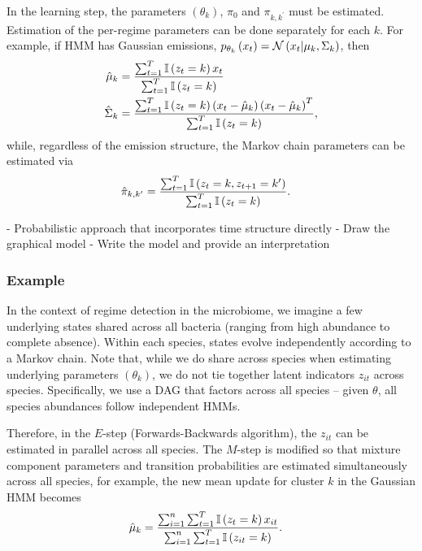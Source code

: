 \documentclass{article}
\begin{document}
In the learning step, the parameters $\left(\theta_{k}\right)$, $\pi_0$ and
$\pi_{k, k^{\prime}}$ must be estimated. Estimation of the per-regime parameters
can be done separately for each $k$. For example, if HMM has Gaussian emissions,
$p_{\theta_{k}}\left(x_{t}\right) = \mathcal{N}\left(x_{t} \vert \mu_{k},
\Sigma_{k}\right)$, then
\begin{align*}
  \hat{\mu}_{k} &= \frac{\sum_{t = 1}^{T} \mathbb{I}\left({z_{t} = k}\right)x_{t}}{\sum_{t = 1}^{T}\mathbb{I}\left({z_{t} = k}\right)} \\
  \hat{\Sigma}_{k} &= \frac{\sum_{t = 1}^{T} \mathbb{I}\left({z_{t} = k}\right)\left(x_{t} - \hat{\mu}_{k}\right)\left(x_{t} - \hat{\mu}_{k}\right)^{T}}
      {\sum_{t = 1}^{T} \mathbb{I}\left({z_{t} = k}\right)},
\end{align*}
while, regardless of the emission structure, the Markov chain parameters can be
estimated via
\begin{align*}
  \hat{\pi}_{k, k^{\prime}} &= \frac{\sum_{t = 1}^{T} \mathbb{I}\left({z_{t} = k, z_{t + 1} = k^{\prime}}\right)}{\sum_{t = 1}^{T} \mathbb{I}\left({z_{t} = k}\right)}.
\end{align*}

- Probabilistic approach that incorporates time structure directly
- Draw the graphical model
- Write the model and provide an interpretation

\subsubsection{Example}
\label{subsubsec:hmm_example}

In the context of regime detection in the microbiome, we imagine a few
underlying states shared across all bacteria (ranging from high abundance to
complete absence). Within each species, states evolve independently according to
a Markov chain. Note that, while we do share across species when estimating
underlying parameters $\left(\theta_{k}\right)$, we do not tie together latent
indicators $z_{it}$ across species. Specifically, we use a DAG that factors
across all species -- given $\theta$, all species abundances follow independent
HMMs.

Therefore, in the $E$-step (Forwards-Backwards algorithm), the $z_{it}$ can be
estimated in parallel across all species. The $M$-step is modified so that
mixture component parameters and transition probabilities are estimated
simultaneously across all species, for example, the new mean update for cluster
$k$ in the Gaussian HMM becomes
\begin{align*}
\hat{\mu}_{k} &= \frac{\sum_{i = 1}^{n}\sum_{t = 1}^{T} \mathbb{I}\left({z_{t} = k}\right)x_{it}}{\sum_{i = 1}^{n}\sum_{t = 1}^{T} \mathbb{I}\left({z_{it} = k}\right)}.
\end{align*}
\end{document}
